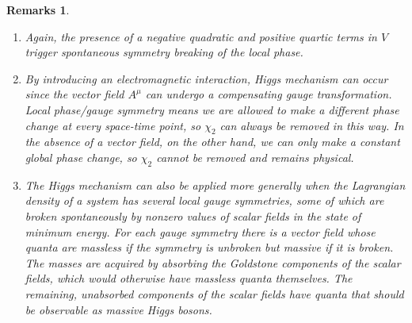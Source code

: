 \documentclass[a4paper]{article}
\newtheorem{remarks}{Remarks}[section]
\theoremstyle{new}
\begin{document}
\begin{remarks}\leavevmode
\begin{enumerate}
\item Again, the presence of a negative quadratic and positive quartic terms in $V$ trigger spontaneous symmetry breaking of the local phase.
\item By introducing an electromagnetic interaction, Higgs mechanism can occur since the vector field $A^\mu$ can undergo a compensating gauge transformation. Local phase/gauge symmetry means we are allowed to make a different phase change at every space-time point, so $\chi_2$ can always be removed in this way. In the absence of a vector field, on the other hand, we can only make a constant global phase change, so $\chi_2$ cannot be removed and remains physical.
\item The Higgs mechanism can also be applied more generally when the Lagrangian density of a system has several local gauge symmetries, some of which are broken spontaneously by nonzero values of scalar fields in the state of minimum energy. For each gauge symmetry there is a vector field whose quanta are massless if the symmetry is unbroken but massive if it is broken. The masses are acquired by absorbing the Goldstone components of the scalar fields, which would otherwise have massless quanta themselves. The remaining, unabsorbed components of the scalar fields have quanta that should be observable as massive Higgs bosons.
\end{enumerate}
\end{remarks}
\end{document}
